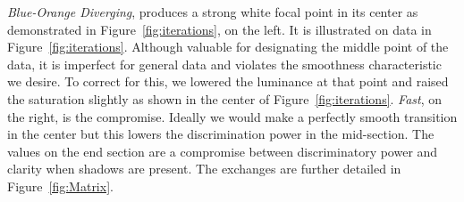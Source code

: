 \documentclass{IEEEcsmag}
\newcommand*{\colormap}[1]{\textsl{#1}\xspace}
\newcommand*{\coolwarm}{\colormap{Cool to Warm}}
\newcommand*{\blueorange}{\colormap{Blue-Orange Diverging}}
\newcommand*{\fast}{\colormap{Fast}}
\begin{document}






\blueorange, produces a strong white focal point in its center as demonstrated in Figure~\ref{fig:iterations}, on the left. %
It is illustrated on data in Figure~\ref{fig:iterations}.
Although valuable for designating the middle point of the data, it is imperfect for general data and violates the smoothness characteristic we desire.
To correct for this, we lowered the luminance at that point and raised the saturation slightly as shown in the center of Figure~\ref{fig:iterations}.
\fast, on the right, is the compromise.
Ideally we would make a perfectly smooth transition in the center but this lowers the discrimination power in the mid-section.
The values on the end section are a compromise between discriminatory power and clarity when shadows are present.
The exchanges are further detailed in Figure~\ref{fig:Matrix}.




\end{document}
